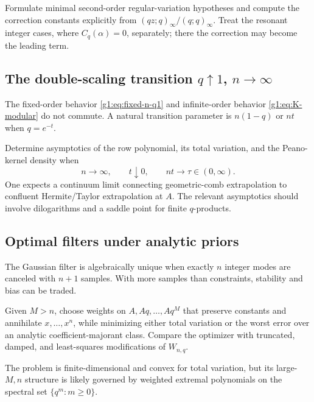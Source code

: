 \begin{problem}
Formulate minimal second-order regular-variation hypotheses and compute the
correction constants explicitly from
$(qz;q)_\infty/(q;q)_\infty$.  Treat the resonant integer cases, where
$C_q(\alpha)=0$, separately; there the correction may become the leading term.
\end{problem}

\subsection{The double-scaling transition $q\uparrow1$, $n\to\infty$}

The fixed-order behavior \eqref{g1:eq:fixed-n-q1} and infinite-order behavior
\eqref{g1:eq:K-modular} do not commute.  A natural transition parameter is
$n(1-q)$ or $nt$ when $q=e^{-t}$.

\begin{problem}
Determine asymptotics of the row polynomial, its total variation, and the
Peano-kernel density when
\[
 n\to\infty,\qquad t\downarrow0,
 \qquad nt\to\tau\in(0,\infty).
\]
One expects a continuum limit connecting geometric-comb extrapolation to
confluent Hermite/Taylor extrapolation at $A$.  The relevant asymptotics should
involve dilogarithms and a saddle point for finite $q$-products.
\end{problem}

\subsection{Optimal filters under analytic priors}

The Gaussian filter is algebraically unique when exactly $n$ integer modes are
canceled with $n+1$ samples.  With more samples than constraints, stability and
bias can be traded.

\begin{problem}
Given $M>n$, choose weights on $A,Aq,\ldots,Aq^M$ that preserve constants and
annihilate $x,\ldots,x^n$, while minimizing either total variation or the worst
error over an analytic coefficient-majorant class.  Compare the optimizer with
truncated, damped, and least-squares modifications of $W_{n,q}$.
\end{problem}

The problem is finite-dimensional and convex for total variation, but its
large-$M,n$ structure is likely governed by weighted extremal polynomials on
the spectral set $\{q^m:m\ge0\}$.

